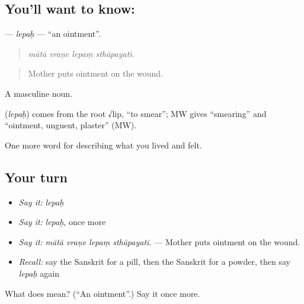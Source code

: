 \subsection*{You'll want to know: }
\textbf{} — \emph{lepaḥ} — \textquotedblleft{}an ointment\textquotedblright{}.

\begin{quote}
   
\end{quote}

\begin{quote}
\emph{mātā vraṇe lepaṃ sthāpayati.}
\end{quote}

\begin{quote}
Mother puts ointment on the wound.
\end{quote}

A masculine noun.

\begin{cousinweb}
\textbf{} (\emph{lepaḥ}) comes from the root √lip, \textquotedblleft{}to smear\textquotedblright{}; MW gives \textquotedblleft{}smearing\textquotedblright{} and \textquotedblleft{}ointment, unguent, plaster\textquotedblright{} (MW).
\end{cousinweb}

\begin{grammarlens}[title={What you've built}]
One more word for describing what you lived and felt.
\end{grammarlens}

\subsection*{Your turn}
\begin{itemize}
\raggedright
  \item \emph{Say it:} \emph{lepaḥ}
  \item \emph{Say it:} \emph{lepaḥ}, once more
  \item \emph{Say it:} \emph{mātā vraṇe lepaṃ sthāpayati.} — Mother puts ointment on the wound.
  \item \emph{Recall:} say the Sanskrit for a pill, then the Sanskrit for a powder, then say \emph{lepaḥ} again
\end{itemize}

\begin{tcolorbox}[breakable,colback=teal!4,colframe=teal!35!black,title={Before you move on}]
What does  mean? (\textquotedblleft{}An ointment\textquotedblright{}.) Say it once more.
\end{tcolorbox}
